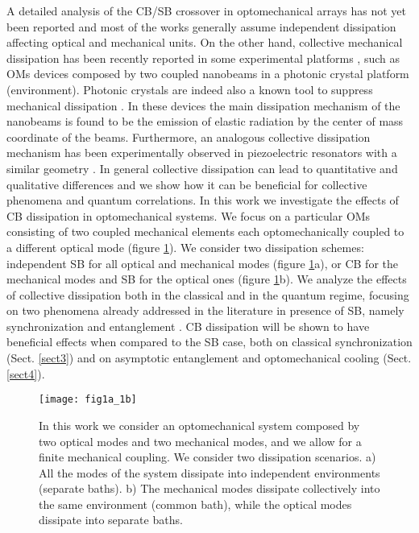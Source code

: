 \documentclass[a4paper]{jpconf}
\begin{document}
A detailed analysis of the 
CB/SB crossover in optomechanical arrays has not yet been reported and most of the works generally assume 
independent dissipation affecting optical and mechanical units. On the other hand, collective mechanical 
dissipation has been recently reported in some experimental platforms \cite{32,33},
such as OMs devices composed by two coupled 
nanobeams in a photonic crystal platform (environment). Photonic crystals are indeed also a known tool to suppress  mechanical dissipation \cite{34,35}. 
In these devices the main dissipation mechanism of the
nanobeams is found to be the emission of elastic radiation by the 
center of mass coordinate of the beams.   Furthermore,  an analogous  collective dissipation mechanism 
has been experimentally observed in piezoelectric resonators with a similar 
geometry \cite{36,37}. In general collective dissipation
can lead to quantitative and qualitative differences and we show how it can be 
beneficial  for collective phenomena and quantum correlations. In this work we investigate the effects of CB dissipation in optomechanical 
systems. We focus on a particular OMs consisting of two coupled mechanical elements 
each optomechanically coupled to a different optical mode (figure \ref{figureone}). We 
consider two dissipation schemes: independent  SB for all optical and mechanical modes (figure \ref{figureone}a), or CB for 
the mechanical modes and SB for the optical ones (figure \ref{figureone}b). We analyze the effects of collective dissipation both in the classical
and in the quantum regime, focusing on two phenomena already addressed in the literature in presence of SB, namely synchronization and entanglement  \cite{9,24}.
CB dissipation will be shown to have beneficial effects when compared to the SB case, both on classical synchronization (Sect. \ref{sect3}) and on asymptotic 
entanglement and optomechanical cooling (Sect. \ref{sect4}).

\begin{figure}[t!]
 \centering
 \texttt{[image: fig1a\_1b]}
 \caption{\label{figureone} In this work we consider an optomechanical system composed by two optical modes and two mechanical modes, and we allow for a finite
 mechanical coupling. We consider two dissipation scenarios. a) All the modes of the system dissipate into independent environments (separate baths). b) The mechanical modes 
 dissipate collectively into the same environment (common bath), while the optical modes dissipate into separate baths.}
\end{figure}
\end{document}
